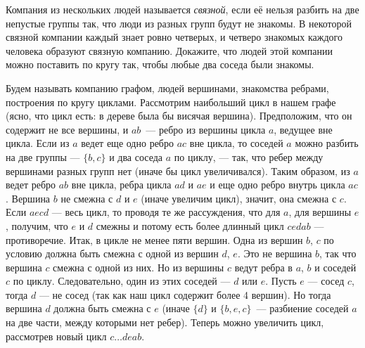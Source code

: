 \problem
Компания из нескольких людей называется \emph{связной}, если её нельзя разбить
на две непустые группы так, что люди из разных групп будут не знакомы.
В некоторой связной компании каждый знает ровно четверых, и четверо знакомых
каждого человека образуют связную компанию.
Докажите, что людей этой компании можно поставить по кругу так, чтобы любые два
соседа были знакомы.

\solution
Будем называть компанию графом, людей вершинами, знакомства ребрами, построения
по кругу циклами.
Рассмотрим наибольший цикл в нашем графе
(ясно, что цикл есть: в дереве была бы висячая вершина).
Предположим, что он содержит не все вершины, и $ab$~--- ребро из вершины цикла
$a$, ведущее вне цикла.
Если из $a$ ведет еще одно ребро $ac$ вне цикла, то соседей $a$ можно разбить
на две группы --- $\{b, c\}$ и два соседа $a$ по циклу, --- так, что ребер
между вершинами разных групп нет (иначе бы цикл увеличивался).
Таким образом, из $a$ ведет ребро $ab$ вне цикла, ребра цикла $ad$ и $ae$ и еще
одно ребро внутрь цикла $ac$.
Вершина $b$ не смежна с $d$ и $e$ (иначе увеличим цикл), значит, она смежна с
$c$.
Если $aecd$ --- весь цикл, то проводя те же рассуждения, что для $a$, для
вершины $e$, получим, что $e$ и $d$ смежны и потому есть более длинный цикл
$cedab$ --- противоречие.
Итак, в цикле не менее пяти вершин.
Одна из вершин $b$, $c$ по условию должна быть смежна с одной из вершин
$d$, $e$.
Это не вершина $b$, так что вершина $c$ смежна с одной из них.
Но из вершины $c$ ведут ребра в $a$, $b$ и соседей $c$ по циклу.
Следовательно, один из этих соседей --- $d$ или $e$.
Пусть $e$ --- сосед $c$, тогда $d$ --- не сосед
(так как наш цикл содержит более 4 вершин).
Но тогда вершина $d$ должна быть смежна с $e$ (иначе $\{d\}$ и $\{b,e,c\}$~---
разбиение соседей $a$ на две части, между которыми нет ребер).
Теперь можно увеличить цикл, рассмотрев новый цикл $c \ldots deab$. 
\endproblem
